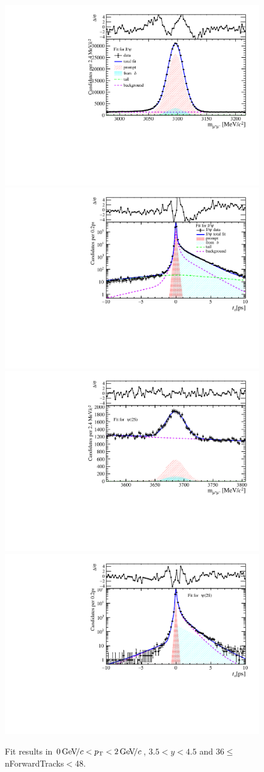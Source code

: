 \begin{figure}[H]
\begin{center}
\includegraphics[width=0.47\linewidth]{pdf/Jpsi/drawmassF/n4y3pt1.pdf}
\includegraphics[width=0.47\linewidth]{pdf/Jpsi/2DFitF/n4y3pt1.pdf}
\vspace*{-0.5cm}
\includegraphics[width=0.47\linewidth]{pdf/Psi2S/drawmassF/n4y3pt1.pdf}
\includegraphics[width=0.47\linewidth]{pdf/Psi2S/2DFitF/n4y3pt1.pdf}
\vspace*{-0.5cm}
\end{center}
\caption{Fit results in $0\text{\,Ge\kern -0.1em V\!/}c<p_{\mathrm{T}}<2\text{\,Ge\kern -0.1em V\!/}c$, $3.5<y<4.5$ and 36$\leq$nForwardTracks$<$48.}
\label{Fitn4y3pt1}
\end{figure}
